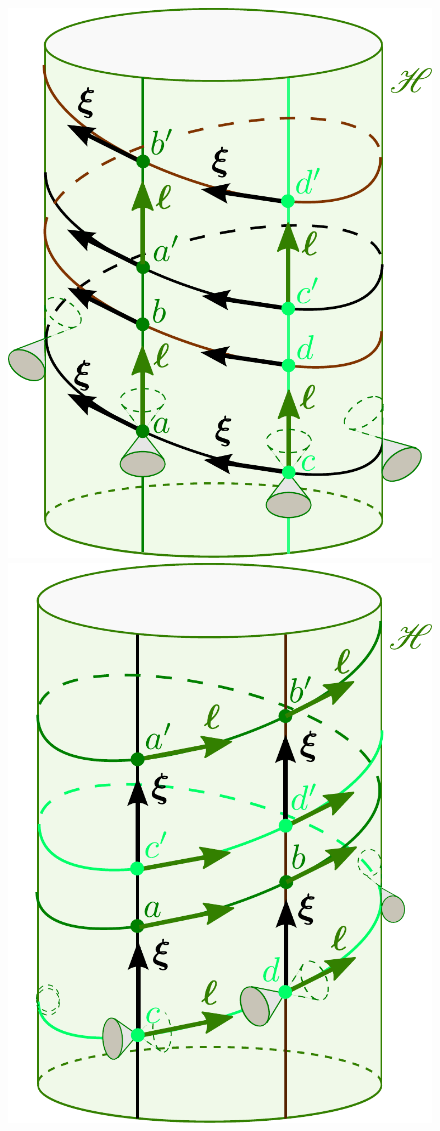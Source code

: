 \begin{figure}
\centerline{\includegraphics[height=0.4\textheight]{sta_rot_horizon_gen.pdf}
\qquad\includegraphics[height=0.4\textheight]{sta_rot_horizon_kil.pdf}}

\end{figure}
